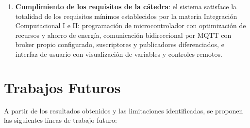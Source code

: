 \begin{enumerate}
  \item \textbf{Cumplimiento de los requisitos de la cátedra}:
        el sistema satisface la totalidad de los requisitos mínimos establecidos
        por la materia Integración Computacional I e II: programación de
        microcontrolador con optimización de recursos y ahorro de energía,
        comunicación bidireccional por MQTT con broker propio configurado,
        suscriptores y publicadores diferenciados, e interfaz de usuario con
        visualización de variables y controles remotos.
\end{enumerate}

\section{Trabajos Futuros}

A partir de los resultados obtenidos y las limitaciones identificadas, se proponen
las siguientes líneas de trabajo futuro:

